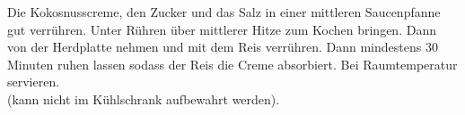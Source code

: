 \begin{multicols}{2}
Die Kokosnusscreme, den Zucker und das Salz in einer mittleren Saucenpfanne
gut verrühren. 
Unter Rühren über mittlerer Hitze zum Kochen bringen.
Dann von der Herdplatte nehmen und mit dem Reis verrühren.
Dann mindestens 30 Minuten ruhen lassen sodass der Reis die Creme absorbiert.
Bei Raumtemperatur servieren.\\




(kann nicht im Kühlschrank aufbewahrt werden).







\end{multicols}
\vfill
